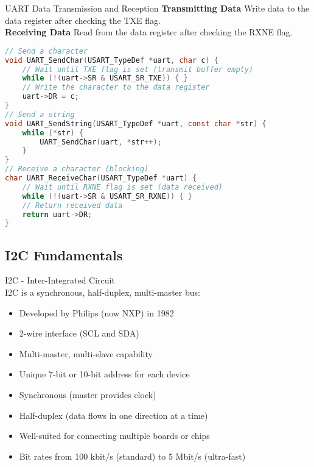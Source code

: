 \begin{KR}{UART Data Transmission and Reception}
\textbf{Transmitting Data}
Write data to the data register after checking the TXE flag.\\
\textbf{Receiving Data}
Read from the data register after checking the RXNE flag.

\begin{lstlisting}[language=C, style=basesmol]
// Send a character
void UART_SendChar(USART_TypeDef *uart, char c) {
    // Wait until TXE flag is set (transmit buffer empty)
    while (!(uart->SR & USART_SR_TXE)) { }
    // Write the character to the data register
    uart->DR = c;
}
// Send a string
void UART_SendString(USART_TypeDef *uart, const char *str) {
    while (*str) {
        UART_SendChar(uart, *str++);
    }
}
// Receive a character (blocking)
char UART_ReceiveChar(USART_TypeDef *uart) {
    // Wait until RXNE flag is set (data received)
    while (!(uart->SR & USART_SR_RXNE)) { }
    // Return received data
    return uart->DR;
}
\end{lstlisting}
\end{KR}








\subsection{I2C Fundamentals}

\begin{concept}{I2C - Inter-Integrated Circuit}\\
I2C is a synchronous, half-duplex, multi-master bus:
\begin{itemize}
    \item Developed by Philips (now NXP) in 1982
    \item 2-wire interface (SCL and SDA)
    \item Multi-master, multi-slave capability
    \item Unique 7-bit or 10-bit address for each device
    \item Synchronous (master provides clock)
    \item Half-duplex (data flows in one direction at a time)
    \item Well-suited for connecting multiple boards or chips
    \item Bit rates from 100 kbit/s (standard) to 5 Mbit/s (ultra-fast)
\end{itemize}
\end{concept}

